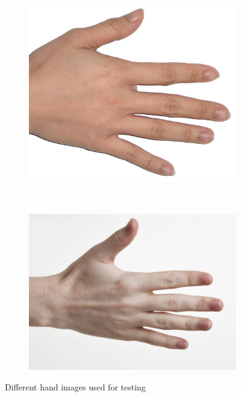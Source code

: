 \documentclass[12pt, a4paper]{article}
\begin{document}
\begin{figure}[H]
\begin{subfigure}[b]{0.20\textwidth}
        \caption{}\label{img:input_hands_1_brown}
    \end{subfigure}
    ~
    \begin{subfigure}[b]{0.20\textwidth}
        \includegraphics[width=\textwidth]{images/hand_light}
        \caption{}\label{img:input_hands_1_light}
    \end{subfigure}
    ~
    \begin{subfigure}[b]{0.20\textwidth}
        \includegraphics[width=\textwidth]{images/hand_pale}
        \caption{}\label{img:input_hands_1_pale}
    \end{subfigure}
    \caption{Different hand images used for testing}\label{img:input_hands_1}
\end{figure}
\end{document}
